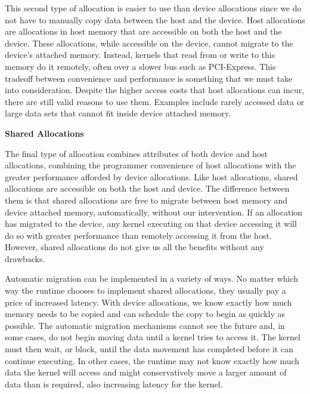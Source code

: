 This second type of allocation is easier to use than device allocations since we do not have to manually copy data between the host and the device. Host allocations are allocations in host memory that are accessible on both the host and the device. These allocations, while accessible on the device, cannot migrate to the device’s attached memory. Instead, kernels that read from or write to this memory do it remotely, often over a slower bus such as PCI-Express. This tradeoff between convenience and performance is something that we must take into consideration. Despite the higher access costs that host allocations can incur, there are still valid reasons to use them. Examples include rarely accessed data or large data sets that cannot fit inside device attached memory.\par

\hspace*{\fill} \par %
\textbf{Shared Allocations}

The final type of allocation combines attributes of both device and host allocations, combining the programmer convenience of host allocations with the greater performance afforded by device allocations. Like host allocations, shared allocations are accessible on both the host and device. The difference between them is that shared allocations are free to migrate between host memory and device attached memory, automatically, without our intervention. If an allocation has migrated to the device, any kernel executing on that device accessing it will do so with greater performance than remotely accessing it from the host. However, shared allocations do not give us all the benefits without any drawbacks.\par

Automatic migration can be implemented in a variety of ways. No matter which way the runtime chooses to implement shared allocations, they usually pay a price of increased latency. With device allocations, we know exactly how much memory needs to be copied and can schedule the copy to begin as quickly as possible. The automatic migration mechanisms cannot see the future and, in some cases, do not begin moving data until a kernel tries to access it. The kernel must then wait, or block, until the data movement has completed before it can continue executing. In other cases, the runtime may not know exactly how much data the kernel will access and might conservatively move a larger amount of data than is required, also increasing latency for the kernel.\par

